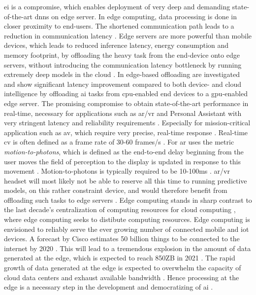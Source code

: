 \gls{ei} is a compromise, which enables deployment of very deep and demanding state-of-the-art \gls{dnn}s on edge server. In edge computing, data processing is done in closer proximity to end-users. The shortened communication path leads to a reduction in communication latency \cite{shi_edge_2016}. Edge servers are more powerful than mobile devices, which leads to reduced inference latency, energy consumption and memory footprint, by offloading the heavy task from the end-device onto edge servers, without introducing the communication latency bottleneck by running extremely deep models in the cloud \cite{zhou_edge_2019}. In \cite{karlsen_prototyping_nodate} edge-based offloading are investigated and show significant latency improvement compared to both device- and cloud intelligence by offloading \gls{ai} tasks from \gls{cpu}-enabled end devices to a \gls{gpu}-enabled edge server. The promising compromise to obtain state-of-the-art performance in real-time, necessary for applications such as \gls{ar}/\gls{vr} and Personal Assistant with very stringent latency and reliability requirements \cite{zhou_edge_2019}. Especially for mission-critical application such as \gls{av}, which require very precise, real-time response \cite{stoica_berkeley_2017}. Real-time \gls{cv} is often defined as a frame rate of 30-60 frames/s \cite{chen_deep_2019}. For \gls{ar} uses the metric \emph{motion-to-photons}, which is defined as the end-to-end delay beginning from the user moves the field of perception to the display is updated in response to this movement \cite{lavalle_virtual_2019}. Motion-to-photons is typically required to be 10-100ms \cite{chen_deep_2019}. \gls{ar}/\gls{vr} headset will most likely not be able to reserve all this time to running predictive models, on this rather constraint device, and would therefore benefit from offloading such tasks to edge servers \cite{chen_deep_2019}. Edge computing stands in sharp contrast to the last decade's centralization of computing resources for cloud computing \cite{shi_edge_2016}, where edge computing seeks to distibute computing resources. Edge computing is envisioned to reliably serve the ever growing number of connected mobile and \gls{iot} devices. A forecast by Cisco estimates 50 billion things to be connected to the internet by 2020 \cite{evans_internet_2011}. This will lead to a tremendous explosion in the amount of data generated at the edge, which is expected to reach 850ZB in 2021 \cite{cisco_cisco_2018}. The rapid growth of data generated at the edge is expected to overwhelm the capacity of cloud data centers and exhaust available bandwidth . Hence processing at the edge is a necessary step in the development and democratizing of \gls{ai} \cite{zhou_edge_2019}.


